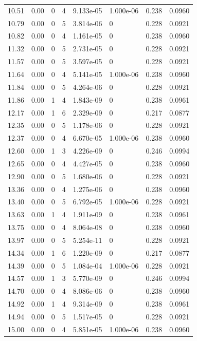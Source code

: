 \documentclass[preview]{standalone}
\begin{document}
{{{\begin{tabular}{L{1.2cm}C{1.2cm} C{0.3cm}C{0.5cm} C{1.4cm}C{1.4cm} C{1.4cm}C{1.4cm}}
  10.51  &  0.00  & 0     &  4 &  9.133e-05  & 1.000e-06  & 0.238 &  0.0960   \\ 
  10.79  &  0.00  & 0     &  5 &  3.814e-06  & 0  & 0.228 &  0.0921   \\ 
  10.82  &  0.00  & 0     &  4 &  1.161e-05  & 0  & 0.238 &  0.0960   \\ 
  11.32  &  0.00  & 0     &  5 &  2.731e-05  & 0  & 0.228 &  0.0921   \\ 
  11.57  &  0.00  & 0     &  5 &  3.597e-05  & 0  & 0.228 &  0.0921   \\ 
  11.64  &  0.00  & 0     &  4 &  5.141e-05  & 1.000e-06  & 0.238 &  0.0960   \\ 
  11.84  &  0.00  & 0     &  5 &  4.264e-06  & 0  & 0.228 &  0.0921   \\ 
  11.86  &  0.00  & 1     &  4 &  1.843e-09  & 0  & 0.238 &  0.0961   \\ 
  12.17  &  0.00  & 1     &  6 &  2.329e-09  & 0  & 0.217 &  0.0877   \\ 
  12.35  &  0.00  & 0     &  5 &  1.178e-06  & 0  & 0.228 &  0.0921   \\ 
  12.37  &  0.00  & 0     &  4 &  6.670e-05  & 1.000e-06  & 0.238 &  0.0960   \\ 
  12.60  &  0.00  & 1     &  3 &  4.226e-09  & 0  & 0.246 &  0.0994   \\ 
  12.65  &  0.00  & 0     &  4 &  4.427e-05  & 0  & 0.238 &  0.0960   \\ 
  12.90  &  0.00  & 0     &  5 &  1.680e-06  & 0  & 0.228 &  0.0921   \\ 
  13.36  &  0.00  & 0     &  4 &  1.275e-06  & 0  & 0.238 &  0.0960   \\ 
  13.40  &  0.00  & 0     &  5 &  6.792e-05  & 1.000e-06  & 0.228 &  0.0921   \\ 
  13.63  &  0.00  & 1     &  4 &  1.911e-09  & 0  & 0.238 &  0.0961   \\ 
  13.75  &  0.00  & 0     &  4 &  8.064e-08  & 0  & 0.238 &  0.0960   \\ 
  13.97  &  0.00  & 0     &  5 &  5.254e-11  & 0  & 0.228 &  0.0921   \\ 
  14.34  &  0.00  & 1     &  6 &  1.220e-09  & 0  & 0.217 &  0.0877   \\ 
  14.39  &  0.00  & 0     &  5 &  1.084e-04  & 1.000e-06  & 0.228 &  0.0921   \\ 
  14.57  &  0.00  & 1     &  3 &  5.770e-09  & 0  & 0.246 &  0.0994   \\ 
  14.70  &  0.00  & 0     &  4 &  8.086e-06  & 0  & 0.238 &  0.0960   \\ 
  14.92  &  0.00  & 1     &  4 &  9.314e-09  & 0  & 0.238 &  0.0961   \\ 
  14.94  &  0.00  & 0     &  5 &  1.517e-05  & 0  & 0.228 &  0.0921   \\ 
  15.00  &  0.00  & 0     &  4 &  5.851e-05  & 1.000e-06  & 0.238 &  0.0960   \\ 
\hline 
\end{tabular} 

}}}
\end{document}
